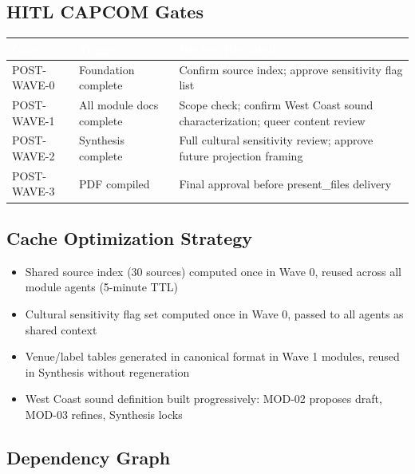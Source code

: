 \documentclass[11pt,letterpaper]{article}
\newcommand{\tableheader}[1]{\textbf{\sffamily\textcolor{white}{#1}}}
\begin{document}
\subsection{HITL CAPCOM Gates}

\begin{center}
\begin{tabularx}{\textwidth}{L{3cm}L{4cm}X}
\toprule
{}
\tableheader{Gate} & \tableheader{Trigger} & \tableheader{Review Required} \\
\midrule
POST-WAVE-0 & Foundation complete & Confirm source index; approve sensitivity flag list \\
POST-WAVE-1 & All module docs complete & Scope check; confirm West Coast sound characterization; queer content review \\
POST-WAVE-2 & Synthesis complete & Full cultural sensitivity review; approve future projection framing \\
POST-WAVE-3 & PDF compiled & Final approval before present\_files delivery \\
\bottomrule
\end{tabularx}
\end{center}

\subsection{Cache Optimization Strategy}

\begin{itemize}[leftmargin=1.5em]
  \item Shared source index (30 sources) computed once in Wave 0, reused across all module agents (5-minute TTL)
  \item Cultural sensitivity flag set computed once in Wave 0, passed to all agents as shared context
  \item Venue/label tables generated in canonical format in Wave 1 modules, reused in Synthesis without regeneration
  \item West Coast sound definition built progressively: MOD-02 proposes draft, MOD-03 refines, Synthesis locks
\end{itemize}

\subsection{Dependency Graph}
\end{document}
